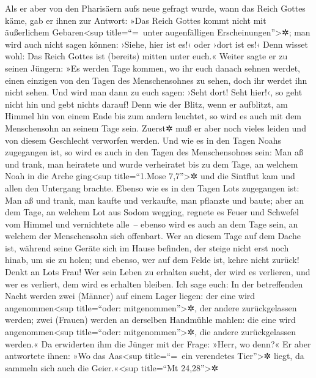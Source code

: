  Als er aber von den Pharisäern aufs neue gefragt wurde,
wann das Reich Gottes käme, gab er ihnen zur Antwort: »Das Reich Gottes
kommt nicht mit äußerlichem Gebaren\textless sup title=``=~unter
augenfälligen Erscheinungen''\textgreater✲;  man wird
auch nicht sagen können: ›Siehe, hier ist es!‹ oder ›dort ist es!‹ Denn
wisset wohl: Das Reich Gottes ist (bereits) mitten unter euch.«
 Weiter sagte er zu seinen Jüngern: »Es werden Tage
kommen, wo ihr euch danach sehnen werdet, einen einzigen von den Tagen
des Menschensohnes zu sehen, doch ihr werdet ihn nicht sehen.
 Und wird man dann zu euch sagen: ›Seht dort! Seht
hier!‹, so geht nicht hin und gebt nichts darauf!  Denn
wie der Blitz, wenn er aufblitzt, am Himmel hin von einem Ende bis zum
andern leuchtet, so wird es auch mit dem Menschensohn an seinem Tage
sein.  Zuerst✲ muß er aber noch vieles leiden und von
diesem Geschlecht verworfen werden.  Und wie es in den
Tagen Noahs zugegangen ist, so wird es auch in den Tagen des
Menschensohnes sein:  Man aß und trank, man heiratete und
wurde verheiratet bis zu dem Tage, an welchem Noah in die Arche
ging\textless sup title=``1.Mose 7,7''\textgreater✲ und die Sintflut kam
und allen den Untergang brachte.  Ebenso wie es in den
Tagen Lots zugegangen ist: Man aß und trank, man kaufte und verkaufte,
man pflanzte und baute;  aber an dem Tage, an welchem Lot
aus Sodom wegging, regnete es Feuer und Schwefel vom Himmel und
vernichtete alle~--  ebenso wird es auch an dem Tage
sein, an welchem der Menschensohn sich offenbart.  Wer an
diesem Tage auf dem Dache ist, während seine Geräte sich im Hause
befinden, der steige nicht erst noch hinab, um sie zu holen; und ebenso,
wer auf dem Felde ist, kehre nicht zurück!  Denkt an Lots
Frau!  Wer sein Leben zu erhalten sucht, der wird es
verlieren, und wer es verliert, dem wird es erhalten bleiben.
 Ich sage euch: In der betreffenden Nacht werden zwei
(Männer) auf einem Lager liegen: der eine wird angenommen\textless sup
title=``oder: mitgenommen''\textgreater✲, der andere zurückgelassen
werden;  zwei (Frauen) werden an derselben Handmühle
mahlen: die eine wird angenommen\textless sup title=``oder:
mitgenommen''\textgreater✲, die andere zurückgelassen werden.«
 Da erwiderten ihm die Jünger mit der Frage: »Herr, wo
denn?« Er aber antwortete ihnen: »Wo das Aas\textless sup title=``=~ein
verendetes Tier''\textgreater✲ liegt, da sammeln sich auch die
Geier.«\textless sup title=``Mt 24,28''\textgreater✲

